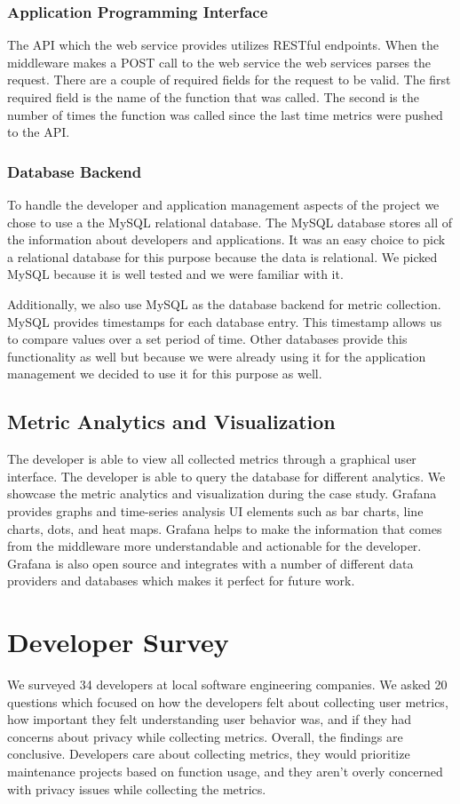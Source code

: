 \subsubsection{Application Programming Interface}
The API which the web service provides utilizes RESTful endpoints. When the middleware makes a POST call to the web service the web services parses the request. There are a couple of required fields for the request to be valid. The first required field is the name of the function that was called. The second is the number of times the function was called since the last time metrics were pushed to the API.

\subsubsection{Database Backend}
To handle the developer and application management aspects of the project we chose to use a the MySQL relational database. The MySQL database stores all of the information about developers and applications. It was an easy choice to pick a relational database for this purpose because the data is relational. We picked MySQL because it is well tested and we were familiar with it. 
 
Additionally, we also use MySQL as the database backend for metric collection. MySQL provides timestamps for each database entry. This timestamp allows us to compare values over a set period of time. Other databases provide this functionality as well but because we were already using it for the application management we decided to use it for this purpose as well. 

\subsection{Metric Analytics and Visualization}
The developer is able to view all collected metrics through a graphical user interface. The developer is able to query the database for different analytics. We showcase the metric analytics and visualization during the case study. Grafana provides graphs and time-series analysis UI elements such as bar charts, line charts, dots, and heat maps. Grafana helps to make the information that comes from the middleware more understandable and actionable for the developer. Grafana is also open source and integrates with a number of different data providers and databases which makes it perfect for future work.

\section{Developer Survey}
We surveyed 34 developers at local software engineering companies. We asked 20 questions which focused on how the developers felt about collecting user metrics, how important they felt understanding user behavior was, and if they had concerns about privacy while collecting metrics. Overall, the findings are conclusive. Developers care about collecting metrics, they would prioritize maintenance projects based on function usage, and they aren’t overly concerned with privacy issues while collecting the metrics. 

